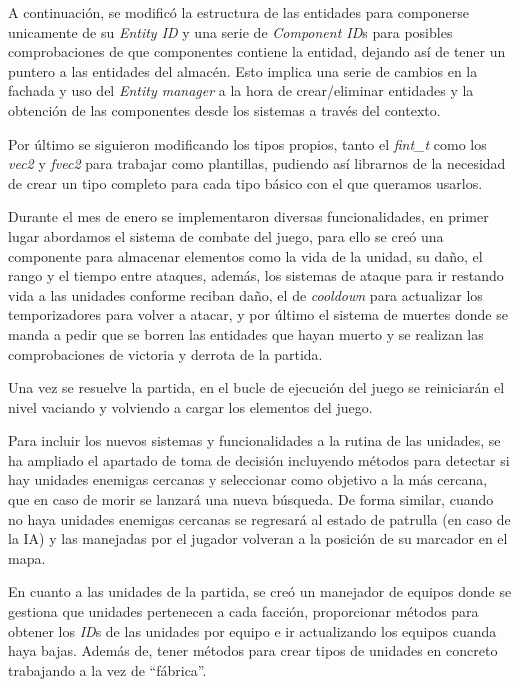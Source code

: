 
A continuación, se modificó la estructura de las entidades para componerse unicamente de su
\textit{Entity ID} y una serie de \textit{Component ID}s para posibles comprobaciones de que
componentes contiene la entidad, dejando así de tener un puntero a las entidades del almacén.
Esto implica una serie de cambios en la fachada y uso del \textit{Entity manager} a la hora
de crear/eliminar entidades y la obtención de las componentes desde los sistemas a través del
contexto. 

Por último se siguieron modificando los tipos propios, tanto el \textit{fint\_t} como
los \textit{vec2} y \textit{fvec2} para trabajar como plantillas, pudiendo así librarnos de
la necesidad de crear un tipo completo para cada tipo básico con el que queramos usarlos.

Durante el mes de enero se implementaron diversas funcionalidades, en primer lugar abordamos
el sistema de combate del juego, para ello se creó una componente para almacenar elementos como
la vida de la unidad, su daño, el rango y el tiempo entre ataques, además, los sistemas de 
ataque para ir restando vida a las unidades conforme reciban daño, el de \textit{cooldown} para
actualizar los temporizadores para volver a atacar, y por último el sistema de muertes donde se
manda a pedir que se borren las entidades que hayan muerto y se realizan las comprobaciones 
de victoria y derrota de la partida.

Una vez se resuelve la partida, en el bucle de ejecución del juego se reiniciarán el nivel
vaciando y volviendo a cargar los elementos del juego.

Para incluir los nuevos sistemas y funcionalidades a la rutina de las unidades, se ha ampliado
el apartado de toma de decisión incluyendo métodos para detectar si hay unidades enemigas 
cercanas y seleccionar como objetivo a la más cercana, que en caso de morir se lanzará una nueva
búsqueda. De forma similar, cuando no haya unidades enemigas cercanas se regresará al estado de
patrulla (en caso de la IA) y las manejadas por el jugador volveran a la posición de su
marcador en el mapa. 

En cuanto a las unidades de la partida, se creó un manejador de equipos donde se gestiona que
unidades pertenecen a cada facción, proporcionar métodos para obtener los \textit{ID}s de las
unidades por equipo e ir actualizando los equipos cuanda haya bajas. Además de, tener métodos
para crear tipos de unidades en concreto trabajando a la vez de ``fábrica''.

